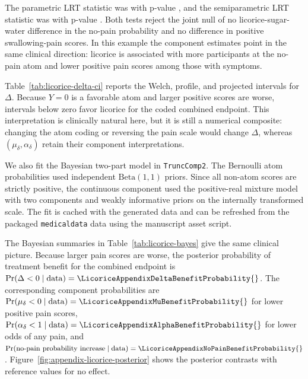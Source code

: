 \documentclass[11pt]{article}
\begin{document}


The parametric LRT statistic was \LicoriceAppendixLRTStatistic{} with p-value \LicoriceAppendixLRTP{}, and the semiparametric LRT statistic was \LicoriceAppendixSPLRTStatistic{} with p-value \LicoriceAppendixSPLRTP{}. Both tests reject the joint null of no licorice-sugar-water difference in the no-pain probability and no difference in positive swallowing-pain scores. In this example the component estimates point in the same clinical direction: licorice is associated with more participants at the no-pain atom and lower positive pain scores among those with symptoms.



Table~\ref{tab:licorice-delta-ci} reports the Welch, profile, and projected intervals for $\Delta$. Because $Y=0$ is a favorable atom and larger positive scores are worse, intervals below zero favor licorice for the coded combined endpoint. This interpretation is clinically natural here, but it is still a numerical composite: changing the atom coding or reversing the pain scale would change $\Delta$, whereas $(\mu_\delta,\alpha_\delta)$ retain their component interpretations.

We also fit the Bayesian two-part model in \texttt{TruncComp2}. The Bernoulli atom probabilities used independent $\mathrm{Beta}(1,1)$ priors. Since all non-atom scores are strictly positive, the continuous component used the positive-real mixture model with two components and weakly informative priors on the internally transformed scale. The fit is cached with the generated data and can be refreshed from the packaged \texttt{medicaldata} data using the manuscript asset script.



The Bayesian summaries in Table~\ref{tab:licorice-bayes} give the same clinical picture. Because larger pain scores are worse, the posterior probability of treatment benefit for the combined endpoint is $\Pr(\Delta<0\mid\mathrm{data})=\LicoriceAppendixDeltaBenefitProbability{}$. The corresponding component probabilities are $\Pr(\mu_\delta<0\mid\mathrm{data})=\LicoriceAppendixMuBenefitProbability{}$ for lower positive pain scores, $\Pr(\alpha_\delta<1\mid\mathrm{data})=\LicoriceAppendixAlphaBenefitProbability{}$ for lower odds of any pain, and $\Pr(\text{no-pain probability increase}\mid\mathrm{data})=\LicoriceAppendixNoPainBenefitProbability{}$. Figure~\ref{fig:appendix-licorice-posterior} shows the posterior contrasts with reference values for no effect.
\end{document}
